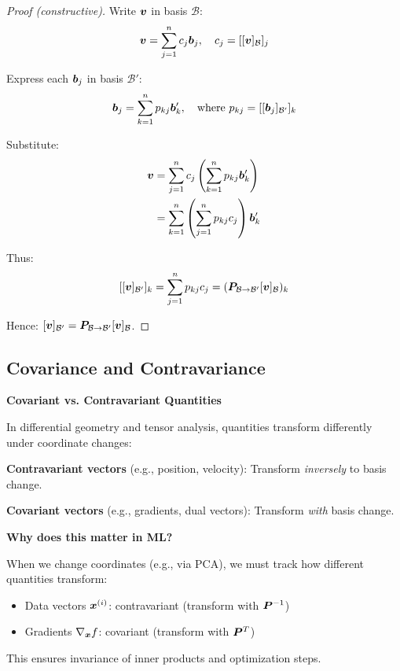 \begin{proof}[Proof (constructive)]
    Write $\bm{v}$ in basis $\mathcal{B}$:
    \[
        \bm{v} = \sum_{j=1}^{n} c_j \bm{b}_j, \quad c_j = [[\bm{v}]_{\mathcal{B}}]_j
    \]

    Express each $\bm{b}_j$ in basis $\mathcal{B}'$:
    \[
        \bm{b}_j = \sum_{k=1}^{n} p_{kj} \bm{b}'_k, \quad \text{where } p_{kj} = [[\bm{b}_j]_{\mathcal{B}'}]_k
    \]

    Substitute:
    \begin{align*}
        \bm{v} & = \sum_{j=1}^{n} c_j \left(\sum_{k=1}^{n} p_{kj} \bm{b}'_k\right) \\
                 & = \sum_{k=1}^{n} \left(\sum_{j=1}^{n} p_{kj} c_j\right) \bm{b}'_k
    \end{align*}

    Thus:
    \[
        [[\bm{v}]_{\mathcal{B}'}]_k = \sum_{j=1}^{n} p_{kj} c_j = (\bm{P}_{\mathcal{B} \to \mathcal{B}'} [\bm{v}]_{\mathcal{B}})_k
    \]

    Hence: $[\bm{v}]_{\mathcal{B}'} = \bm{P}_{\mathcal{B} \to \mathcal{B}'}
            [\bm{v}]_{\mathcal{B}}$.
\end{proof}

\subsection{Covariance and Contravariance}

\begin{philobox}
    \textbf{Covariant vs. Contravariant Quantities}

    In differential geometry and tensor analysis, quantities transform differently
    under coordinate changes:

    \textbf{Contravariant vectors} (e.g., position, velocity): Transform \textit{inversely} to basis change.

    \textbf{Covariant vectors} (e.g., gradients, dual vectors): Transform \textit{with} basis change.

    \textbf{Why does this matter in ML?}

    When we change coordinates (e.g., via PCA), we must track how different
    quantities transform:
    \begin{itemize}
        \item Data vectors $\bm{x}^{(i)}$: contravariant (transform with $\bm{P}^{-1}$)
        \item Gradients $\nabla_{\bm{x}} f$: covariant (transform with $\bm{P}^T$)
    \end{itemize}

    This ensures invariance of inner products and optimization steps.
\end{philobox}

